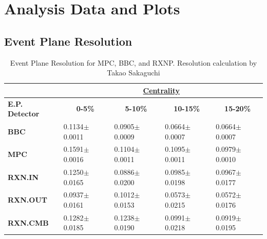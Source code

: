 \chapter{Analysis Data and Plots} %
\label{app:data}

\section{Event Plane Resolution}
\begin{table}[H]
\centering
\caption{Event Plane Resolution for MPC, BBC, and RXNP. Resolution calculation by Takao Sakaguchi\citep{pi0v2run8dau}}
\label{EPrestable}
\begin{tabular}{lllll}
\textbf{}                                    & \multicolumn{4}{c}{{\ul \textbf{Centrality}}}                                                                                                              \\ \hline
\multicolumn{1}{|l|}{\textbf{E.P. Detector}} & \multicolumn{1}{c|}{\textbf{0-5\%}} & \multicolumn{1}{c|}{\textbf{5-10\%}} & \multicolumn{1}{c|}{\textbf{10-15\%}} & \multicolumn{1}{c|}{\textbf{15-20\%}} \\ \hline
\multicolumn{1}{|l|}{\textbf{BBC}}           & \multicolumn{1}{l|}{0.1134$\pm$0.0011}  & \multicolumn{1}{l|}{0.0905$\pm$0.0009}   & \multicolumn{1}{l|}{0.0664$\pm$0.0007}    & \multicolumn{1}{l|}{0.0664$\pm$0.0007}    \\ \hline
\multicolumn{1}{|l|}{\textbf{MPC}}           & \multicolumn{1}{l|}{0.1591$\pm$0.0016}  & \multicolumn{1}{l|}{0.1104$\pm$0.0011}   & \multicolumn{1}{l|}{0.1095$\pm$0.0011}    & \multicolumn{1}{l|}{0.0979$\pm$0.0010}    \\ \hline
\multicolumn{1}{|l|}{\textbf{RXN.IN}}        & \multicolumn{1}{l|}{0.1250$\pm$0.0165}  & \multicolumn{1}{l|}{0.0886$\pm$0.0200}   & \multicolumn{1}{l|}{0.0985$\pm$0.0198}    & \multicolumn{1}{l|}{0.0967$\pm$0.0177}    \\ \hline
\multicolumn{1}{|l|}{\textbf{RXN.OUT}}       & \multicolumn{1}{l|}{0.0937$\pm$0.0161}  & \multicolumn{1}{l|}{0.1012$\pm$0.0153}   & \multicolumn{1}{l|}{0.0573$\pm$0.0215}    & \multicolumn{1}{l|}{0.0572$\pm$0.0176}    \\ \hline
\multicolumn{1}{|l|}{\textbf{RXN.CMB}}       & \multicolumn{1}{l|}{0.1282$\pm$0.0185}  & \multicolumn{1}{l|}{0.1238$\pm$0.0190}   & \multicolumn{1}{l|}{0.0991$\pm$0.0218}    & \multicolumn{1}{l|}{0.0919$\pm$0.0195}    \\ \hline
\end{tabular}
\end{table}

